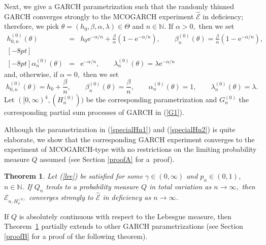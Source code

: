 \documentclass[number,citesort,seceqn,dvips]{arxbj}
\newcommand{\eqref}[1]{(\ref{#1})}
\newtheorem{theorem}{Theorem}[section]
\newcommand{\NN}{\mathbb{N}}
\newcommand{\EEE}{{\mathcal E}}
\begin{document}
Next, we give a GARCH parametrization such that the randomly thinned
GARCH converges strongly to the MCOGARCH experiment $\widehat\EEE$ in
deficiency; therefore, we pick
$\theta=(h_0,\beta,\alpha,\lambda)\in\Theta$ and $n\in\NN$. If
$\alpha>0,$ then we set
%
\begin{eqnarray}\label{specialHn1}
h^{(0)}_{0,n}(\theta)&=&h_0\mathrm{e}^{-\alpha/n}+\frac
\beta\alpha(1 - \mathrm{e}^{-\alpha/n}),\qquad
\beta^{(0)}_n(\theta) = \frac\beta\alpha (1 - \mathrm{e}^{-\alpha
/n}) ,\nonumber\\ [-8pt]\\ [-8pt]
\alpha^{(0)}_n(\theta)&=&\mathrm{e}^{-\alpha/n},\qquad
\lambda^{(0)}_n(\theta) = \lambda\mathrm{e}^{-\alpha/n}\nonumber
\end{eqnarray}
%
and, otherwise, if $\alpha=0,$ then we set
%
\begin{equation}\label{specialHn2}
h^{(0)}_{0,n}(\theta)=h_0+\frac\beta
n,\qquad \beta^{(0)}_n(\theta) = \frac\beta n,\qquad  \alpha^{(0)}_n(\theta) = 1,\qquad \lambda
^{(0)}_n(\theta)=\lambda .
\end{equation}
%
Let $([0,\infty)^4,(H^{(0)}_n))$ be the corresponding parametrization
and $G^{(0)}_n$ the corresponding partial sum processes of GARCH in
\eqref{G1}.

Although the parametrization in \eqref{specialHn1} and \eqref{specialHn2}
is quite elaborate, we show that the corresponding GARCH experiment
converges to the experiment of MCOGARCH-type with no restrictions on
the limiting probability measure $Q$ assumed (see Section \ref{proofA}
for a~proof).
%
\begin{theorem}\label{th2}
Let \eqref{lre} be satisfied for
some $\gamma\in(0,\infty)$ and $p_n\in(0,1)$, $n\in\NN$.
If $Q_n$ tends to a probability measure $Q$ in total variation as
$n\to\infty,$ then $\EEE_{n,H_n^{(0)}}$ converges strongly to
$\widehat\EEE$ in deficiency as $n\to\infty$.
\end{theorem}

If $Q$ is absolutely continuous with respect to the Lebesgue measure,
then Theorem~\ref{th2} partially extends to other GARCH
parametrizations (see Section \ref{proofB} for a proof of the following
theorem).
\end{document}
